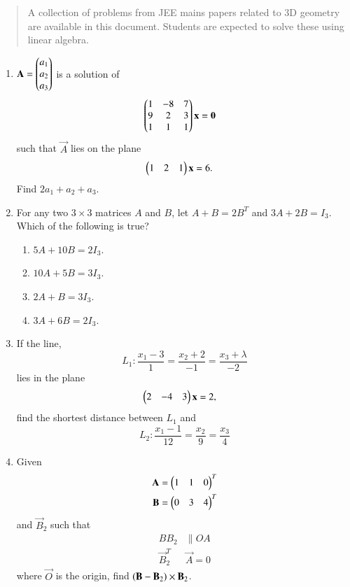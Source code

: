 \documentclass[journal,12pt,twocolumn]{IEEEtran}
\begin{document}
\begin{abstract}
	A  collection of problems from JEE mains papers related to 3D geometry  are available in 
this document.  Students are expected to solve these using linear algebra.
\end{abstract}
\begin{enumerate}[label=\arabic*.]
\item  $\mathbf{A} = \begin{pmatrix}a_1 \\ a_2 \\ a_3\end{pmatrix}$ is a solution of
\begin{align}
\begin{pmatrix}1 & -8 & 7 \\ 9 & 2 & 3 \\ 1 & 1 & 1\end{pmatrix}\mathbf{x} &= \mathbf{0}
\end{align}
%
such that $\vec{A}$ lies on the plane
\begin{align}
\begin{pmatrix}1 & 2 & 1\end{pmatrix}\mathbf{x} &= 6.
\end{align}
%
Find $2a_1+a_2+a_3$.
\item For any two $3 \times 3$ matrices $A$ and $B$, let $A+B = 2B^T$ and $3A+2B=I_3$.  Which of the following 
is true?
\begin{enumerate}
\item $5A+10B=2I_3$.
\item $10A+5B=3I_3$.
\item $2A+B=3I_3$.
\item $3A+6B=2I_3$.
\end{enumerate}
%
\item If the line, 
\begin{equation}
L_1:\frac{x_1-3}{1}=
\frac{x_2+2}{-1} = 
\frac{x_3+\lambda}{-2}
\end{equation}
lies in the plane
\begin{align}
\begin{pmatrix}2 & -4 & 3\end{pmatrix}\mathbf{x} &= 2,
\end{align}
find the shortest distance between $L_1$ and
\begin{equation}
L_2:\frac{x_1-1}{12}=
\frac{x_2}{9} = 
\frac{x_3}{4}
\end{equation}
\item Given
\begin{align}
\mathbf{A} = \begin{pmatrix}1 & 1 & 0\end{pmatrix}^T
\\
\mathbf{B} = \begin{pmatrix}0 & 3 & 4\end{pmatrix}^T
\end{align}
and $\vec{B}_2$ such that
\begin{align}
BB_2&\parallel OA
\\
\vec{B}_2^T &\vec{A} = 0
\end{align}
where $\vec{O}$ is the origin, find $\left(\mathbf{B}-\mathbf{B}_2\right)\times \mathbf{B}_2$.

\end{enumerate}
\end{document}

